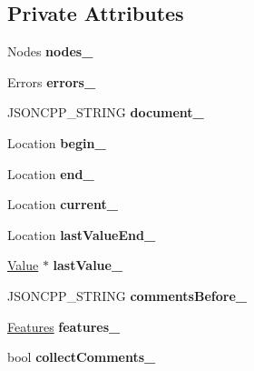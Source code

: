 \subsection*{Private Attributes}
\begin{DoxyCompactItemize}
\item 
\mbox{\label{classJson_1_1Reader_ada3d2c47699dad662e6d156c8c78a6ac}} 
Nodes {\bfseries nodes\+\_\+}
\item 
\mbox{\label{classJson_1_1Reader_a1bbce45dc4df753bed60c129f4b5147c}} 
Errors {\bfseries errors\+\_\+}
\item 
\mbox{\label{classJson_1_1Reader_abf99e137bc92a93623dc97598702261a}} 
J\+S\+O\+N\+C\+P\+P\+\_\+\+S\+T\+R\+I\+NG {\bfseries document\+\_\+}
\item 
\mbox{\label{classJson_1_1Reader_a327166839022ea91f0a8290960a8af76}} 
Location {\bfseries begin\+\_\+}
\item 
\mbox{\label{classJson_1_1Reader_a714793579cbf4ee7c5a7223d2c8d77c1}} 
Location {\bfseries end\+\_\+}
\item 
\mbox{\label{classJson_1_1Reader_a2f2feb5201a26da7aa133d2f7434479b}} 
Location {\bfseries current\+\_\+}
\item 
\mbox{\label{classJson_1_1Reader_a497a114f7b760f1b794b8fff9876615a}} 
Location {\bfseries last\+Value\+End\+\_\+}
\item 
\mbox{\label{classJson_1_1Reader_a87cc75ae5adc6a6755f0ba1c7255ff6c}} 
\hyperlink{classJson_1_1Value}{Value} $\ast$ {\bfseries last\+Value\+\_\+}
\item 
\mbox{\label{classJson_1_1Reader_af777967adaf0b2e882efa07673754381}} 
J\+S\+O\+N\+C\+P\+P\+\_\+\+S\+T\+R\+I\+NG {\bfseries comments\+Before\+\_\+}
\item 
\mbox{\label{classJson_1_1Reader_aa9984ff8f519b5541346157b7aebf97b}} 
\hyperlink{classJson_1_1Features}{Features} {\bfseries features\+\_\+}
\item 
\mbox{\label{classJson_1_1Reader_a8e9ce743f6004f0596692f0a9ee4626c}} 
bool {\bfseries collect\+Comments\+\_\+}
\end{DoxyCompactItemize}


